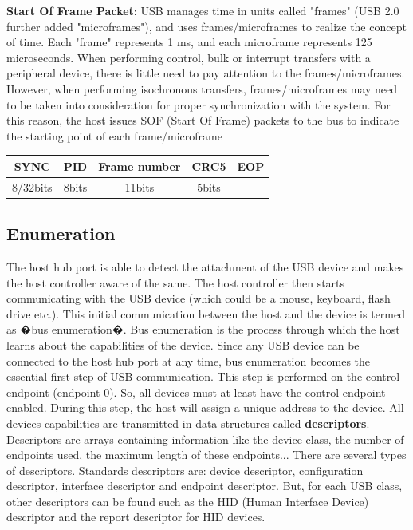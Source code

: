 \documentclass[pdftex,10pt,a4paper]{report}
\newenvironment{packed_item}{
\begin{itemize}
  \setlength{\itemsep}{1pt}
  \setlength{\parskip}{0pt}
  \setlength{\parsep}{0pt}
}{\end{itemize}}
\begin{document}
\begin{packed_item}
  	
	\item \textbf{Start Of Frame Packet}: USB manages time in units called "frames" (USB 2.0 further added "microframes"), and uses frames/microframes to realize the concept of time. Each "frame" represents 1 ms, and each microframe represents 125 microseconds. When performing control, bulk or interrupt transfers with a peripheral device, there is little need to pay attention to the frames/microframes. However, when performing isochronous transfers, frames/microframes may need to be taken into consideration for proper synchronization with the system. For this reason, the host issues SOF (Start Of Frame) packets to the bus to indicate the starting point of each frame/microframe
	
		\begin{center}
		\begin{tabular}{|c|c|c|c|c|}
  	\hline
  		SYNC & PID & Frame number & CRC5 & EOP \\ \hline
  		8/32bits & 8bits & 11bits & 5bits &   \\
  	\hline
  	\end{tabular}
  	\end{center}
  	
\end{packed_item}


\subsection{Enumeration}
The host hub port is able to detect the attachment of the USB device and makes the host controller aware of the same. The host controller then starts communicating with the USB device (which could be a mouse, keyboard, flash drive etc.). This initial communication between the host and the device is termed as �bus enumeration�. Bus enumeration is the process through which the host learns about the capabilities of the device. Since any USB device can be connected to the host hub port at any time, bus enumeration becomes the essential first step of USB communication. This step is performed on the control endpoint (endpoint 0). So, all devices must at least have the control endpoint enabled.
During this step, the host will assign a unique address to the device.
All devices capabilities are transmitted in data structures called \textbf{descriptors}. Descriptors are arrays containing information like the device class, the number of endpoints used, the maximum length of these endpoints... There are several types of descriptors. Standards descriptors are: device descriptor, configuration descriptor, interface descriptor and endpoint descriptor. But, for each USB class, other descriptors can be found such as the HID (Human Interface Device) descriptor and the report descriptor for HID devices.
\end{document}

